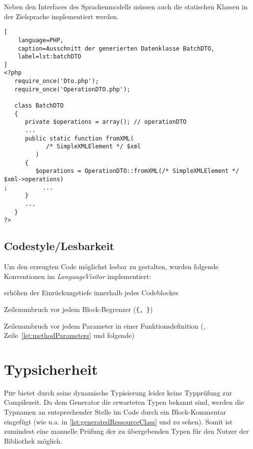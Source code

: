Neben den Interfaces des Sprachenmodells müssen auch die statischen Klassen in der Zielsprache implementiert werden.

\begin{minipage}{\textwidth}
\begin{lstlisting}[
    language=PHP,
    caption=Ausschnitt der generierten Datenklasse BatchDTO,
    label=lst:batchDTO
]
<?php
   require_once('Dto.php');
   require_once('OperationDTO.php');

   class BatchDTO
   {
      private $operations = array(); // operationDTO 
      ...
      public static function fromXML(
            /* SimpleXMLElement */ $xml
         )
      {
         $operations = OperationDTO::fromXML(/* SimpleXMLElement */ $xml->operations)
;          ...
      }
      ...
   }
?>
\end{lstlisting}
\end{minipage}

\subsection{Codestyle/Lesbarkeit}
\label{se:code_style_readability}

Um den erzeugten Code möglichst lesbar zu gestalten, wurden folgende Konventionen im \emph{LanguageVisitor} implementiert:
\begin{compactitem}
  \item erhöhen der Einrückungstiefe innerhalb jedes Codeblockes
  \item Zeilenumbruch vor jedem Block-Begrenzer (\texttt{\{, \}})
  \item Zeilenumbruch vor jedem Parameter in einer Funktionsdefinition (, Zeile~\ref{lst:methodParameters} und folgende)
\end{compactitem}

\section{Typsicherheit}
\label{sec:type_safety}

\textsc{Php} bietet durch seine dynamische Typisierung leider keine Typprüfung zur Compilezeit. Da dem Generator die erwarteten Typen bekannt sind, werden die Typnamen an entsprechender Stelle im Code durch ein Block-Kommentar eingefügt (wie u.a. in \cref{lst:generatedRessourceClass} und  zu sehen). Somit ist zumindest eine manuelle Prüfung der zu übergebenden Typen für den Nutzer der Bibliothek möglich.

